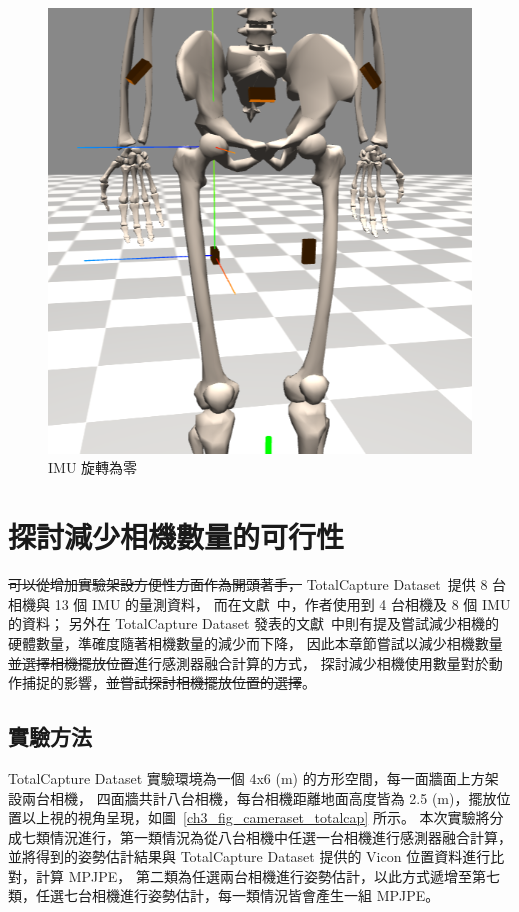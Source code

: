 \begin{figure}[!ht]
\begin{minipage}{.3\textwidth}
   \end{minipage}%
   \begin{minipage}{.3\textwidth}
      \centering
      \includegraphics[width=.8\linewidth, height=.8\linewidth]{figure/ch3_fig_imu_rot.png}
      \caption[IMU 旋轉為零]{IMU 旋轉為零}
      \label{ch3_fig_imu_rot}
    \end{minipage}
\end{figure}

\section{探討減少相機數量的可行性}
\sout{可以從增加實驗架設方便性方面作為開頭著手，}
TotalCapture Dataset~\cite{Trumble:BMVC:2017}提供 8 台相機與 13 個 IMU 的量測資料，
而在文獻~\cite{zhang2020fusing}中，作者使用到 4 台相機及 8 個 IMU 的資料；
另外在 TotalCapture Dataset 發表的文獻~\cite{trumble2017total}中則有提及嘗試減少相機的硬體數量，準確度隨著相機數量的減少而下降，
因此本章節嘗試以減少相機數量\sout{並選擇相機擺放位置}進行感測器融合計算的方式，
探討減少相機使用數量對於動作捕捉的影響，\sout{並嘗試探討相機擺放位置的選擇}。

\subsection{實驗方法}
TotalCapture Dataset 實驗環境為一個 4x6 (m) 的方形空間，每一面牆面上方架設兩台相機，
四面牆共計八台相機，每台相機距離地面高度皆為 2.5 (m)，擺放位置以上視的視角呈現，如圖~\ref{ch3_fig_cameraset_totalcap} 所示。
本次實驗將分成七類情況進行，第一類情況為從八台相機中任選一台相機進行感測器融合計算，
並將得到的姿勢估計結果與 TotalCapture Dataset 提供的 Vicon 位置資料進行比對，計算 MPJPE，
第二類為任選兩台相機進行姿勢估計，以此方式遞增至第七類，任選七台相機進行姿勢估計，每一類情況皆會產生一組 MPJPE。


